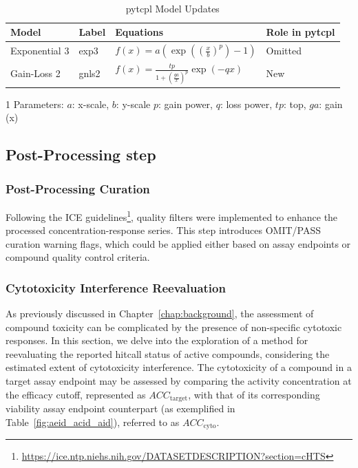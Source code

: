 \begin{table}
    \caption{pytcpl Model Updates}~\label{table:pytcpl_models}
    \centering
    \begin{threeparttable}[b]
    \begin{tabular}{llll}
    \toprule
    \textbf{Model} & \textbf{Label} & \textbf{Equations\tnote{1}} & \textbf{Role in pytcpl} \\
    \midrule
    Exponential 3 & exp3 & \(f(x) = a\left(\exp\left({\left(\frac{x}{b}\right)}^{p}\right) - 1\right)\) & Omitted \\
    Gain-Loss 2 & gnls2 & \(f(x) = \frac{tp}{1 + {\left(\frac{ga}{x}\right)}^{p}}\exp\left({-qx}\right)\) & New \\
    \bottomrule
    \end{tabular}
    \begin{tablenotes}
        \item [1] Parameters: $a$: x-scale, $b$: y-scale $p$: gain power, $q$: loss power, $tp$: top, $ga$: gain (x)
    \end{tablenotes}
\end{threeparttable}
\end{table}

\subsection{Post-Processing step}
\subsubsection{Post-Processing Curation}
Following the ICE guidelines\footnote{\url{https://ice.ntp.niehs.nih.gov/DATASETDESCRIPTION?section=cHTS}}, quality filters were implemented to enhance the processed concentration-response series. This step introduces OMIT/PASS curation warning flags, which could be applied either based on assay endpoints or compound quality control criteria.

\subsubsection{Cytotoxicity Interference Reevaluation}
As previously discussed in Chapter~\ref{chap:background}, the assessment of compound toxicity can be complicated by the presence of non-specific cytotoxic responses. In this section, we delve into the exploration of a method for reevaluating the reported hitcall status of active compounds, considering the estimated extent of cytotoxicity interference. The cytotoxicity of a compound in a target assay endpoint may be assessed by comparing the activity concentration at the efficacy cutoff, represented as $ACC_{\text{target}}$, with that of its corresponding viability assay endpoint counterpart (as exemplified in Table~\ref{fig:aeid_acid_aid}), referred to as $ACC_{\text{cyto}}$. 

